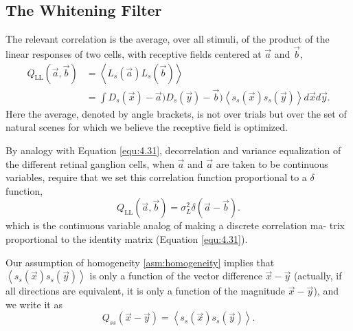\subsection{The Whitening Filter}
The relevant correlation is the average, over all stimuli, of the product of the linear responses
of two cells, with receptive fields centered at $\vec{a}$ and
$\vec{b}$,
\begin{equation}
  \begin{aligned}
     \label{equ:4.366}
  Q_{\text{LL}}(\vec{a},\vec{b})&=\left\langle L_s(\vec{a})L_s(\vec{b})
  \right\rangle\\
  &=\int{D_s(\vec{x})-\vec{a})D_s(\vec{y})-\vec{b})\left\langle s_s(\vec{x})s_s(\vec{y}) \right\rangle d\vec{x}d\vec{y}}.
  \end{aligned}
\end{equation}
Here the average, denoted by angle brackets, is not over trials but over the
set of natural scenes for which we believe the receptive field is
optimized.
\begin{prop}
  By analogy with Equation \ref{equ:4.31}, decorrelation and variance equalization of
the different retinal ganglion cells, when $\vec{a}$ and $\vec{a}$ are taken to be continuous
variables, require that we set this correlation function proportional to a $\delta$
function,
\begin{equation}
  \label{equ:4.37}
  Q_{\text{LL}}(\vec{a},\vec{b})=\sigma_L^2\delta(\vec{a}-\vec{b}).
\end{equation}
which is the continuous variable analog of making a discrete correlation ma-
trix proportional to the identity matrix (Equation \ref{equ:4.31}).
\end{prop}

\begin{thm}
  Our assumption of homogeneity \ref{asm:homogeneity}
  implies that $\left\langle s_s(\vec{x})s_s(\vec{y})\right\rangle$ is only a function of the vector difference $\vec{x}-\vec{y}$ (actually, if all directions are equivalent, it is only a function of the magnitude $\vec{x}-\vec{y}$), and we write it as
  \begin{equation}
    \label{equ:4.38}
    Q_{ss}(\vec{x}-\vec{y})=\left\langle s_s(\vec{x})s_s(\vec{y})\right\rangle.
  \end{equation}
\end{thm}


